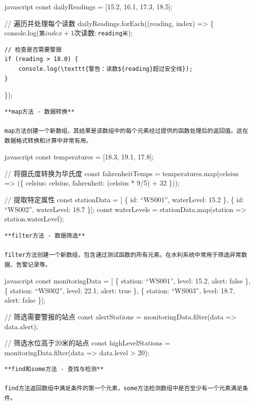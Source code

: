 {javascript const dailyReadings = {[}15.2, 16.1, 17.3, 18.5{]};

// 遍历并处理每个读数 dailyReadings.forEach((reading, index) =\textgreater{} \{ console.log(\texttt{第${index + 1}次读数: ${reading}米});

\begin{verbatim}
// 检查是否需要警报
if (reading > 18.0) {
    console.log(\texttt{警告：读数${reading}超过安全线});
}
\end{verbatim}

\});

\begin{lstlisting}
**map方法 - 数据转换**

map方法创建一个新数组，其结果是该数组中的每个元素经过提供的函数处理后的返回值。这在数据格式转换和计算中非常有用。
\end{lstlisting}

javascript const temperatures = {[}18.3, 19.1, 17.8{]};

// 将摄氏度转换为华氏度 const fahrenheitTemps = temperatures.map(celsius =\textgreater{} (\{ celsius: celsius, fahrenheit: (celsius * 9/5) + 32 \}));

// 提取特定属性 const stationData = {[} \{ id: ``WS001'', waterLevel: 15.2 \}, \{ id: ``WS002'', waterLevel: 18.7 \}{]}; const waterLevels = stationData.map(station =\textgreater{} station.waterLevel);

\begin{lstlisting}
**filter方法 - 数据筛选**

filter方法创建一个新数组，包含通过测试函数的所有元素。在水利系统中常用于筛选异常数据、告警记录等。
\end{lstlisting}

javascript const monitoringData = {[} \{ station: ``WS001'', level: 15.2, alert: false \}, \{ station: ``WS002'', level: 22.1, alert: true \}, \{ station: ``WS003'', level: 18.7, alert: false \}{]};

// 筛选需要警报的站点 const alertStations = monitoringData.filter(data =\textgreater{} data.alert);

// 筛选水位高于20米的站点 const highLevelStations = monitoringData.filter(data =\textgreater{} data.level \textgreater{} 20);

\begin{lstlisting}
**find和some方法 - 查找与检测**

find方法返回数组中满足条件的第一个元素，some方法检测数组中是否至少有一个元素满足条件。
\end{lstlisting}

}
